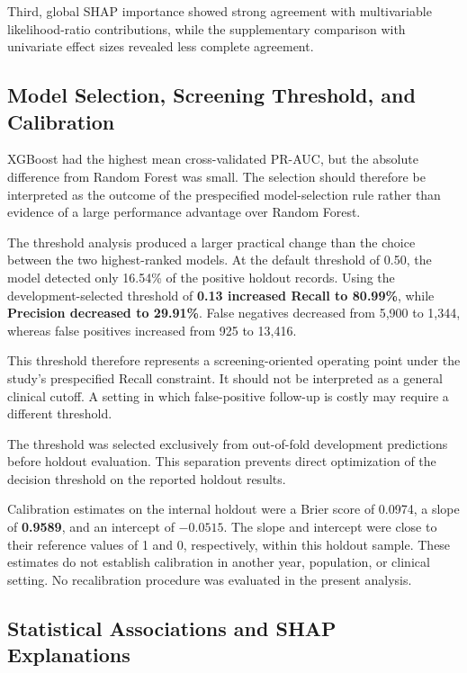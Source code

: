 \documentclass[pdflatex,sn-basic,Numbered]{sn-jnl}
\begin{document}
Third, global SHAP importance showed strong agreement with multivariable likelihood-ratio contributions, while the supplementary comparison with univariate effect sizes revealed less complete agreement.



\subsection{Model Selection, Screening Threshold, and Calibration}
\label{subsec:model_discussion}

XGBoost had the highest mean cross-validated PR-AUC, but the absolute
difference from Random Forest was small.
The selection should therefore be interpreted as the outcome of the
prespecified model-selection rule rather than evidence of a large
performance advantage over Random Forest.

The threshold analysis produced a larger practical change than the choice
between the two highest-ranked models.
At the default threshold of 0.50, the model detected only 16.54\% of the
positive holdout records.
Using the development-selected threshold of
\textbf{0.13 increased Recall to 80.99\%}, while
\textbf{Precision decreased to 29.91\%}.
False negatives decreased from 5,900 to 1,344, whereas false positives
increased from 925 to 13,416.

This threshold therefore represents a screening-oriented operating point
under the study's prespecified Recall constraint.
It should not be interpreted as a general clinical cutoff.
A setting in which false-positive follow-up is costly may require a
different threshold.

The threshold was selected exclusively from out-of-fold development
predictions before holdout evaluation.
This separation prevents direct optimization of the decision threshold on
the reported holdout results.

Calibration estimates on the internal holdout were
a Brier score of 0.0974, a slope of \textbf{0.9589}, and an intercept of
$-0.0515$.
The slope and intercept were close to their reference values of 1 and 0,
respectively, within this holdout sample.
These estimates do not establish calibration in another year, population,
or clinical setting.
No recalibration procedure was evaluated in the present analysis.




\subsection{Statistical Associations and SHAP Explanations}
\label{subsec:shap_discussion}
\end{document}
